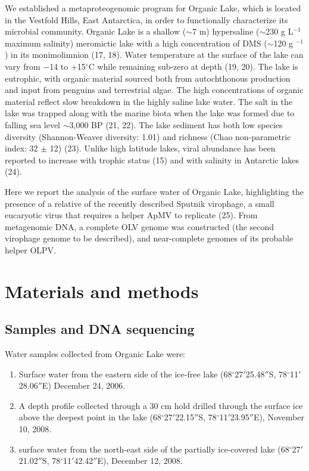We established a metaproteogenomic program for Organic Lake, which is located in the Vestfold Hills, East Antarctica, in order to functionally characterize its microbial community. 
Organic Lake is a shallow ($\sim$7 m) hypersaline ($\sim$230 g L$^{-1}$ maximum salinity) meromictic lake with a high concentration of \ac{DMS} ($\sim$120 \textmu{}g $^{-1}$) in its monimolimnion (17, 18). 
Water temperature at the surface of the lake can vary from $-$14 to $+$15$^{\circ}$C while remaining sub-zero at depth (19, 20). 
The lake is eutrophic, with organic material sourced both from autochthonous production and input from penguins and terrestrial algae. 
The high concentrations of organic material reflect slow breakdown in the highly saline lake water. 
The salt in the lake was trapped along with the marine biota when the lake was formed due to falling sea level $\sim$3,000 BP (21, 22). 
The lake sediment has both low species diversity (Shannon-Weaver diversity: 1.01) and richness (Chao non-parametric index: 32 $\pm$ 12) (23). 
Unlike high latitude lakes, viral abundance has been reported to increase with trophic status (15) and with salinity in Antarctic lakes (24). 

Here we report the analysis of the surface water of Organic Lake, highlighting the presence of a relative of the recently described Sputnik virophage, a small eucaryotic virus that requires a helper \ac{ApMV} to replicate (25). 
From metagenomic \textsc{DNA}, a complete \ac{OLV} genome was constructed (the second virophage genome to be described), and near-complete genomes of its probable helper \ac{OLPV}.


\section{Materials and methods}

\subsection{Samples and DNA sequencing}
Water samples collected from Organic Lake were: 

\begin{enumerate}
\item Surface water from the eastern side of the ice-free lake (68$^{\circ}$27$'$25.48$''$S, 78$^{\circ}$11$'$28.06$''$E) December 24, 2006.
\item A depth profile collected through a 30 cm hold drilled through the surface ice above the deepest point in the lake (68$^{\circ}$27$'$22.15$''$S, 78$^{\circ}$11$'$23.95$''$E), November 10, 2008. 
\item surface water from the north-east side of the partially ice-covered lake (68$^{\circ}$27$'$21.02$''$S, 78$^{\circ}$11$'$42.42$''$E), December 12, 2008. 
\end{enumerate}

